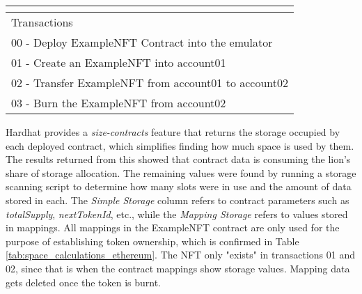 \documentclass[../NFTComp_IEEE.tex]{subfiles}
\begin{document}
\begin{table}[ht]
{\begin{tabular}{ccccc}
            \multicolumn{1}{l}{}                               & \multicolumn{1}{l}{}                                                           & \multicolumn{1}{l}{}                         & \multicolumn{1}{l}{}                          & \multicolumn{1}{l}{}                \\ \hline
            \multicolumn{5}{|l|}{Transactions}                                                                                                                                                                                                                                       \\ \hline
            \multicolumn{5}{|l|}{00 - Deploy ExampleNFT Contract into the emulator}                                                                                                                                                                                                  \\ \hline
            \multicolumn{5}{|l|}{01 - Create an ExampleNFT into account01}                                                                                                                                                                                                           \\ \hline
            \multicolumn{5}{|l|}{02 - Transfer ExampleNFT from account01 to account02}                                                                                                                                                                                               \\ \hline
            \multicolumn{5}{|l|}{03 - Burn the ExampleNFT from account02}                                                                                                                                                                                                            \\ \hline
        \end{tabular}%
    }
\end{table}

Hardhat provides a \textit{size-contracts} feature that returns the storage occupied by each deployed contract, which simplifies finding how much space is used by them. The results returned from this showed that contract data is consuming the lion's share of storage allocation. The remaining values were found by running a storage scanning script to determine how many slots were in use and the amount of data stored in each. The \textit{Simple Storage} column refers to contract parameters such as \textit{totalSupply}, \textit{nextTokenId}, etc., while the \textit{Mapping Storage} refers to values stored in mappings. All mappings in the ExampleNFT contract are only used for the purpose of establishing token ownership, which is confirmed in Table \ref{tab:space_calculations_ethereum}. The NFT only "exists" in transactions 01 and 02, since that is when the contract mappings show storage values. Mapping data gets deleted once the token is burnt.
\end{document}
